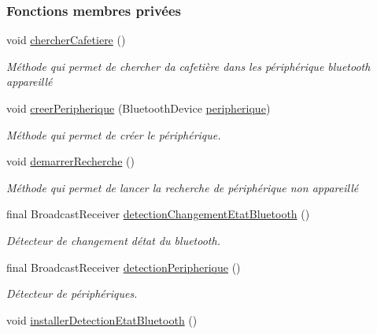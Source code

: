 \subsubsection*{Fonctions membres privées}
\begin{DoxyCompactItemize}
\item 
void \hyperlink{classcom_1_1example_1_1ekawa_1_1_communication_afc96e58f53fc167fe9fc76a229c01cb0}{chercher\+Cafetiere} ()
\begin{DoxyCompactList}\small\item\em Méthode qui permet de chercher da cafetière dans les périphérique bluetooth appareillé \end{DoxyCompactList}\item 
void \hyperlink{classcom_1_1example_1_1ekawa_1_1_communication_a41f24da10de9e598f65941bf55320566}{creer\+Peripherique} (Bluetooth\+Device \hyperlink{classcom_1_1example_1_1ekawa_1_1_communication_a59a25b4807148701560e4341f79c0c16}{peripherique})
\begin{DoxyCompactList}\small\item\em Méthode qui permet de créer le périphérique. \end{DoxyCompactList}\item 
void \hyperlink{classcom_1_1example_1_1ekawa_1_1_communication_a4b8036f1d4f4f37e15c85886af645900}{demarrer\+Recherche} ()
\begin{DoxyCompactList}\small\item\em Méthode qui permet de lancer la recherche de périphérique non appareillé \end{DoxyCompactList}\item 
final Broadcast\+Receiver \hyperlink{classcom_1_1example_1_1ekawa_1_1_communication_a7fb7acee2a343c884103481715ab4e65}{detection\+Changement\+Etat\+Bluetooth} ()
\begin{DoxyCompactList}\small\item\em Détecteur de changement d\textquotesingle{}état du bluetooth. \end{DoxyCompactList}\item 
final Broadcast\+Receiver \hyperlink{classcom_1_1example_1_1ekawa_1_1_communication_a4e46e30e8c22ae617b52260d198a76ca}{detection\+Peripherique} ()
\begin{DoxyCompactList}\small\item\em Détecteur de périphériques. \end{DoxyCompactList}\item 
void \hyperlink{classcom_1_1example_1_1ekawa_1_1_communication_a6640c878b7a4c97af7ccda45e33ead80}{installer\+Detection\+Etat\+Bluetooth} ()

\end{DoxyCompactItemize}
